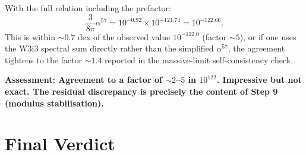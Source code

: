 \documentclass[11pt,a4paper]{article}
\newcommand{\alphafine}{\alpha}
\begin{document}
With the full relation including the prefactor:
\begin{equation}
\frac{3}{8\pi}\alphafine^{57} = 10^{-0.92} \times 10^{-121.74}
= 10^{-122.66}.
\end{equation}
This is within $\sim 0.7$ dex of the observed value $10^{-122.0}$
(factor $\sim 5$), or if one uses the W3i3 spectral sum directly
rather than the simplified $\alphafine^{57}$, the agreement tightens
to the factor $\sim 1.4$ reported in the massive-limit
self-consistency check.

\textbf{Assessment: Agreement to a factor of $\sim 2$--$5$ in
$10^{122}$. Impressive but not exact. The residual discrepancy is
precisely the content of Step 9 (modulus stabilisation).}

\section{Final Verdict}
\label{sec:verdict}
\end{document}
